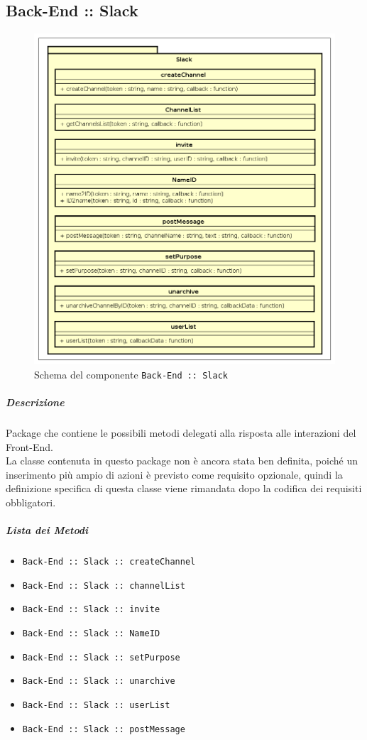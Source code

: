 \documentclass[../ManualeSviluppatore_v2.0.0.tex]{subfiles}
\begin{document}
\subsection{Back-End :: Slack}
\begin{figure}[!h]
	\centering
	\includegraphics[scale=0.6]{Architettura/Back-End/Slack.png}
	\caption{Schema del componente \texttt{Back-End :: Slack}}
\end{figure}
\subparagraph{Descrizione} Package che contiene le possibili metodi delegati alla risposta alle interazioni del Front-End.\\
La classe contenuta in questo package non è ancora stata ben definita, poiché un inserimento più ampio di azioni è previsto come requisito opzionale, quindi la definizione specifica di questa classe viene rimandata dopo la codifica dei requisiti obbligatori.
\subparagraph{Lista dei Metodi}
\begin{itemize}
\item \texttt{Back-End :: Slack :: createChannel}
\item \texttt{Back-End :: Slack :: channelList}
\item \texttt{Back-End :: Slack :: invite}
\item \texttt{Back-End :: Slack :: NameID}
\item \texttt{Back-End :: Slack :: setPurpose}
\item \texttt{Back-End :: Slack :: unarchive}
\item \texttt{Back-End :: Slack :: userList}
\item \texttt{Back-End :: Slack :: postMessage}
\end{itemize}
\end{document}
